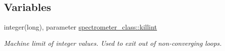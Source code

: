 \subsection*{Variables}
\begin{DoxyCompactItemize}
\item 
integer(long), parameter \hyperlink{namespacespectrometer__class_a5564f6a94902c50fefd03dd3f5ec4e47}{spectrometer\+\_\+class\+::killint}
\begin{DoxyCompactList}\small\item\em Machine limit of integer values. Used to exit out of non-\/converging loops. \end{DoxyCompactList}\end{DoxyCompactItemize}
